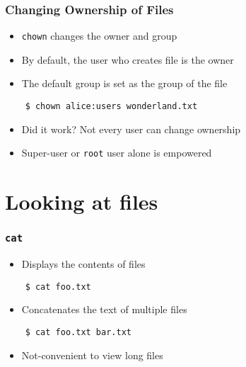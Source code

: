 \documentclass[12pt,compress]{beamer}
\begin{document}
\begin{frame}[fragile]
  \frametitle{Changing Ownership of Files}
  \begin{itemize}
  \item \texttt{chown} changes the owner and group
  \item By default, the user who creates file is the owner
  \item The default group is set as the group of the file
  \end{itemize}
  \begin{lstlisting}
    $ chown alice:users wonderland.txt
  \end{lstlisting} %
  \begin{itemize}
  \item Did it work? \alert{Not every user can change ownership}
  \item Super-user or \texttt{root} user alone is empowered
  \end{itemize}
\end{frame}

\section{Looking at files}
\begin{frame}[fragile]
  \frametitle{\texttt{cat}}
  \begin{itemize}
  \item Displays the contents of files
  \end{itemize}
  \begin{lstlisting}
    $ cat foo.txt
  \end{lstlisting} %
  \begin{itemize}
  \item Concatenates the text of multiple files
  \end{itemize}
  \begin{lstlisting}
    $ cat foo.txt bar.txt
  \end{lstlisting} %
  \begin{itemize}
  \item Not-convenient to view long files
  \end{itemize}
\end{frame}
\end{document}
